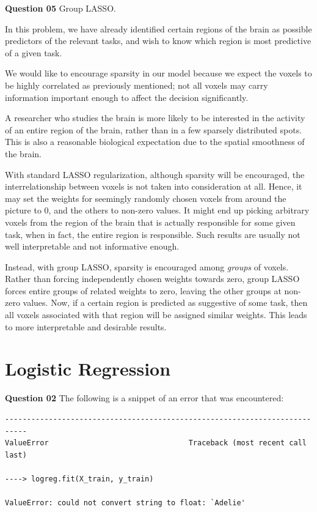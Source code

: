 \documentclass{article}[a4paper]
\begin{document}
	\textbf{Question 05} Group LASSO.

	In this problem, we have already identified certain regions of the brain as possible predictors of the relevant tasks, and wish to know which region is most predictive of a given task.

	We would like to encourage sparsity in our model because we expect the voxels to be highly correlated as previously mentioned; not all voxels may carry information important enough to affect the decision significantly.

	A researcher who studies the brain is more likely to be interested in the activity of an entire region of the brain, rather than in a few sparsely distributed spots. This is also a reasonable biological expectation due to the spatial smoothness of the brain.

	With standard LASSO regularization, although sparsity will be encouraged, the interrelationship between voxels is not taken into consideration at all. Hence, it may set the weights for seemingly randomly chosen voxels from around the picture to $0$, and the others to non-zero values. It might end up picking arbitrary voxels from the region of the brain that is actually responsible for some given task, when in fact, the entire region is responsible. Such results are usually not well interpretable and not informative enough.

	Instead, with group LASSO, sparsity is encouraged among \textit{groups} of voxels. Rather than forcing independently chosen weights towards zero, group LASSO forces entire groups of related weights to zero, leaving the other groups at non-zero values. Now, if a certain region is predicted as suggestive of some task, then all voxels associated with that region will be assigned similar weights. This leads to more interpretable and desirable results.

	\section{Logistic Regression}

	\textbf{Question 02} The following is a snippet of an error that was encountered:
	\begin{verbatim}
---------------------------------------------------------------------------
ValueError                                Traceback (most recent call last)

----> logreg.fit(X_train, y_train)

ValueError: could not convert string to float: `Adelie'\end{verbatim}
	
\end{document}
